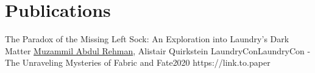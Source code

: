\section{Publications}
\pubListStart

\pubItem
{The Paradox of the Missing Left Sock: An Exploration into Laundry's Dark Matter}
{\underline{Muzammil Abdul Rehman}, Alistair Quirkstein}
{LaundryCon}{LaundryCon - The Unraveling Mysteries of Fabric and Fate}{2020}
{https://link.to.paper}






\pubListEnd
